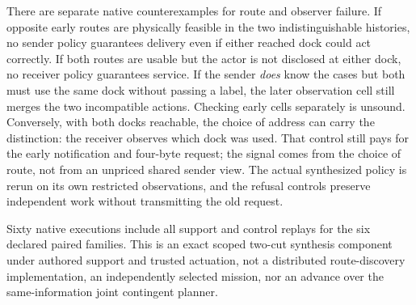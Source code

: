 \documentclass{article}
\begin{document}
There are separate native counterexamples for route and observer
failure. If opposite early routes are physically feasible in the
two indistinguishable histories, no sender policy guarantees
delivery even if either reached dock could act correctly.
If both routes are usable but the actor is not disclosed at either
dock, no receiver policy guarantees service. If the sender
\emph{does} know the cases but both must use the same dock without
passing a label, the later observation cell still merges the two
incompatible actions. Checking early cells separately is unsound.
Conversely, with both docks reachable, the choice of address can
carry the distinction: the receiver observes which dock was used.
That control still pays for the early notification and four-byte
request; the signal comes from the choice of route, not from an
unpriced shared sender view. The actual synthesized policy is
rerun on its own restricted observations, and the refusal controls
preserve independent work without transmitting the old request.

Sixty native executions include all support and control replays
for the six declared paired families. This is an exact scoped
two-cut synthesis component under authored support and trusted
actuation, not a distributed route-discovery implementation,
an independently selected mission, nor an advance over the
same-information joint contingent planner.
\end{document}
